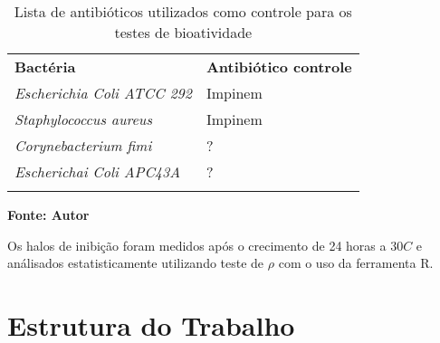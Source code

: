 \begin{table}[!htb]
    \caption{Lista de antibióticos utilizados como controle para os testes de bioatividade}
    \label{tab:lista_antibioticos}
    \centering
    \begin{tabular}{ll}
    \toprule
    \textbf{Bactéria}                           & \textbf{Antibiótico controle} \\
    \rowcolor[HTML]{F3F3F3}
    \textit{Escherichia Coli ATCC 292} & Impinem               \\
    \rowcolor[HTML]{DBDEDE} 
    \textit{Staphylococcus aureus}     & Impinem               \\
    \rowcolor[HTML]{F3F3F3}
    \textit{Corynebacterium fimi}      & ?                     \\
    \rowcolor[HTML]{DBDEDE} 
    \textit{Escherichai Coli APC43A}   & ?                     \\
    \bottomrule \\
    \end{tabular}
    \begin{small}\textbf{Fonte: Autor}\end{small} 
\end{table}


Os halos de inibição foram medidos após o crecimento de 24 horas a $30$\textdegree$C$
e análisados estatisticamente utilizando teste de $\rho$ com
o uso da ferramenta R.

\section{Estrutura do Trabalho}



